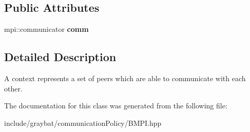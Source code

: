 \subsection*{Public Attributes}
\begin{DoxyCompactItemize}
\item 
\hypertarget{classgraybat_1_1communicationPolicy_1_1BMPI_1_1Context_a2a348c5eb12ba9bcb5eecb5608c8aa93}{}mpi\+::communicator {\bfseries comm}\label{classgraybat_1_1communicationPolicy_1_1BMPI_1_1Context_a2a348c5eb12ba9bcb5eecb5608c8aa93}

\end{DoxyCompactItemize}


\subsection{Detailed Description}
A context represents a set of peers which are able to communicate with each other. 

The documentation for this class was generated from the following file\+:\begin{DoxyCompactItemize}
\item 
include/graybat/communication\+Policy/B\+M\+P\+I.\+hpp\end{DoxyCompactItemize}
